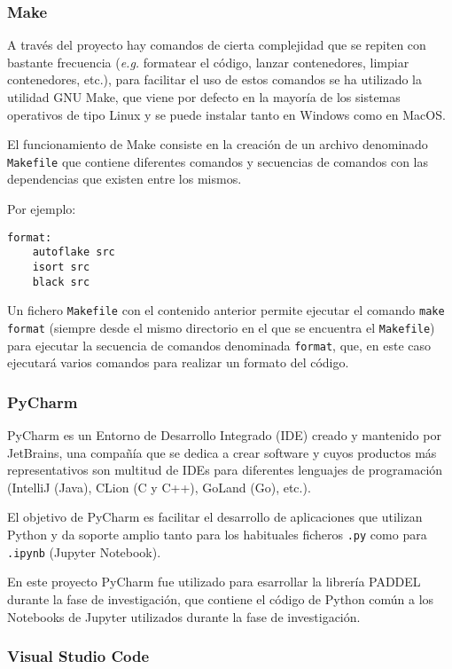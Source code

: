 \subsubsection{Make}

A través del proyecto hay comandos de cierta complejidad que se repiten con
bastante frecuencia (\textit{e.g.} formatear el código, lanzar contenedores,
limpiar contenedores, etc.), para facilitar el uso de estos comandos se ha
utilizado la utilidad GNU Make, que viene por defecto en la mayoría de los
sistemas operativos de tipo Linux y se puede instalar tanto en Windows como en
MacOS.

El funcionamiento de Make consiste en la creación de un archivo denominado
\texttt{Makefile} que contiene diferentes comandos y secuencias de comandos con
las dependencias que existen entre los mismos.

Por ejemplo:

\begin{verbatim}
format:
    autoflake src
    isort src
    black src
\end{verbatim}

Un fichero \texttt{Makefile} con el contenido anterior permite ejecutar el
comando \texttt{make format} (siempre desde el mismo directorio en el que se
encuentra el \texttt{Makefile}) para ejecutar la secuencia de comandos
denominada \texttt{format}, que, en este caso ejecutará varios comandos para
realizar un formato del código.

\subsubsection{PyCharm}

PyCharm es un Entorno de Desarrollo Integrado (IDE) creado y mantenido por
JetBrains, una compañía que se dedica a crear software y cuyos productos más
representativos son multitud de IDEs para diferentes lenguajes de programación
(IntelliJ (Java), CLion (C y C++), GoLand (Go), etc.).

El objetivo de PyCharm es facilitar el desarrollo de aplicaciones que utilizan
Python y da soporte amplio tanto para los habituales ficheros \texttt{.py} como
para \texttt{.ipynb} (Jupyter Notebook).

En este proyecto PyCharm fue utilizado para esarrollar la librería PADDEL
durante la fase de investigación, que contiene el código de Python común a los
Notebooks de Jupyter utilizados durante la fase de investigación.

\subsubsection{Visual Studio Code}

